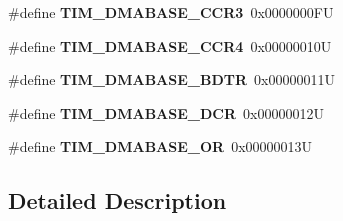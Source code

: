 \begin{DoxyCompactItemize}
\#define {\bfseries T\+I\+M\+\_\+\+D\+M\+A\+B\+A\+S\+E\+\_\+\+C\+C\+R3}~0x0000000\+FU
\item 
\mbox{\label{group___t_i_m___d_m_a___base__address_gaea24fd3f528163da065cbdce3c68ef23}} 
\#define {\bfseries T\+I\+M\+\_\+\+D\+M\+A\+B\+A\+S\+E\+\_\+\+C\+C\+R4}~0x00000010U
\item 
\mbox{\label{group___t_i_m___d_m_a___base__address_ga767eab033d485d32de80b46f70be3341}} 
\#define {\bfseries T\+I\+M\+\_\+\+D\+M\+A\+B\+A\+S\+E\+\_\+\+B\+D\+TR}~0x00000011U
\item 
\mbox{\label{group___t_i_m___d_m_a___base__address_gab3e5aaf0cb815b4a2469d3046eca0201}} 
\#define {\bfseries T\+I\+M\+\_\+\+D\+M\+A\+B\+A\+S\+E\+\_\+\+D\+CR}~0x00000012U
\item 
\mbox{\label{group___t_i_m___d_m_a___base__address_ga4b50ac8b63d27e309695ba36643bc1d0}} 
\#define {\bfseries T\+I\+M\+\_\+\+D\+M\+A\+B\+A\+S\+E\+\_\+\+OR}~0x00000013U
\end{DoxyCompactItemize}


\subsection{Detailed Description}
